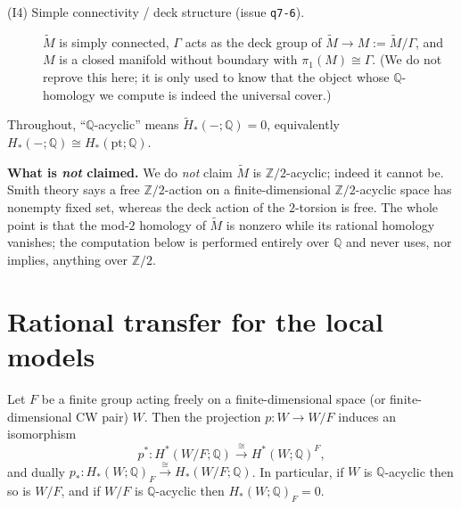 \documentclass[12pt]{article}
\begin{document}
\begin{description}
\item[(I4) Simple connectivity / deck structure (issue \texttt{q7-6}).]
$\widetilde M$ is simply connected, $\Gamma$ acts as the deck group of
$\widetilde M\to M:=\widetilde M/\Gamma$, and $M$ is a closed manifold
without boundary with $\pi_1(M)\cong\Gamma$. (We do not reprove this here; it
is only used to know that the object whose $\mathbb{Q}$-homology we compute is
indeed the universal cover.)
\end{description}

Throughout, ``$\mathbb{Q}$-acyclic'' means $\widetilde H_*(-;\mathbb{Q})=0$,
equivalently $H_*(-;\mathbb{Q})\cong H_*(\mathrm{pt};\mathbb{Q})$.

\medskip

\noindent\textbf{What is \emph{not} claimed.}
We do \emph{not} claim $\widetilde M$ is $\mathbb{Z}/2$-acyclic; indeed it
cannot be. Smith theory says a free $\mathbb{Z}/2$-action on a finite-dimensional
$\mathbb{Z}/2$-acyclic space has nonempty fixed set, whereas the deck action of
the $2$-torsion is free. The whole point is that the mod-$2$ homology of
$\widetilde M$ is nonzero while its rational homology vanishes; the
computation below is performed entirely over $\mathbb{Q}$ and never uses, nor
implies, anything over $\mathbb{Z}/2$.

\section{Rational transfer for the local models}\label{sec:transfer}

\begin{lemma}\label{lem:transfer}
Let $F$ be a finite group acting freely on a finite-dimensional space (or
finite-dimensional CW pair) $W$. Then the projection $p:W\to W/F$ induces an
isomorphism
\[
  p^*:H^*(W/F;\mathbb{Q})\xrightarrow{\ \cong\ }H^*(W;\mathbb{Q})^{F},
\]
and dually $p_*:H_*(W;\mathbb{Q})_{F}\xrightarrow{\cong}H_*(W/F;\mathbb{Q})$.
In particular, if $W$ is $\mathbb{Q}$-acyclic then so is $W/F$, and if $W/F$ is
$\mathbb{Q}$-acyclic then $H_*(W;\mathbb{Q})_F=0$.
\end{lemma}
\end{document}
